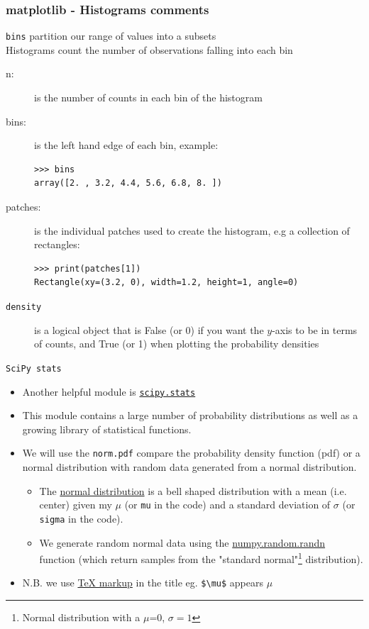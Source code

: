 \documentclass[xcolor=svgnames]{beamer}
\newcommand{\nl}{\\[1em]}
\newcommand{\ft}[1]{\frametitle{#1}}
\begin{document}
\begin{frame}[fragile]\ft{matplotlib - Histograms comments}
{\tt bins} partition our range of values into a subsets\nl
Histograms count the number of observations falling into each bin
\begin{description}
\item[n:] is the number of counts in each bin of the histogram
\item [bins:] is the left hand edge of each bin, example:
\begin{Verbatim}[xleftmargin=0.1in]
>>> bins
array([2. , 3.2, 4.4, 5.6, 6.8, 8. ])
\end{Verbatim}

\item [patches:] is the individual patches used to create the histogram, e.g a collection of rectangles:
\begin{Verbatim}[xleftmargin=0.1in]
>>> print(patches[1])
Rectangle(xy=(3.2, 0), width=1.2, height=1, angle=0)
\end{Verbatim}
\item [{\tt density}] is a logical object that is False (or 0) if you want the $y$-axis to be in terms of counts, and True (or 1) when plotting the probability densities

\end{description}

\end{frame}





\begin{frame}[fragile]{\tt SciPy stats}
\begin{itemize}
\item Another helpful module is \href{https://docs.scipy.org/doc/scipy/reference/stats.html}{\tt scipy.stats}\nl
\item This module contains a large number of probability distributions as well as a growing library of statistical functions.\nl
\item We will use the {\tt norm.pdf} compare the probability density function (pdf) or a normal distribution with random data generated from a normal distribution.
\begin{itemize}
\item The \href{https://en.wikipedia.org/wiki/Normal_distribution}{normal distribution} is a bell shaped distribution with a mean (i.e. center) given my $\mu$ (or {\tt mu} in the code) and a standard deviation of $\sigma$ (or {\tt sigma} in the code).%
\item We generate random normal data using the \href{https://docs.scipy.org/doc/numpy/reference/generated/numpy.random.randn.html}{numpy.random.randn} function (which return samples from the "standard normal"\footnote{Normal distribution with a $\mu$=0, $\sigma=1$} distribution).\nl
\end{itemize}
\item N.B. we use  \href{https://matplotlib.org/users/mathtext.html}{TeX markup} in the title eg. \verb|$\mu$| appears $\mu$
\end{itemize}

\end{frame}
\end{document}
